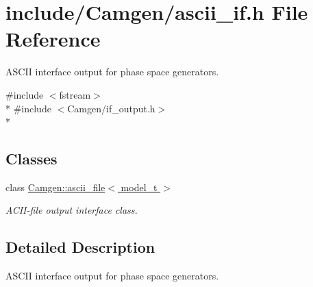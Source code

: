 \hypertarget{a00602}{}\section{include/\+Camgen/ascii\+\_\+if.h File Reference}
\label{a00602}


A\+S\+C\+I\+I interface output for phase space generators.  


{\ttfamily \#include $<$fstream$>$}\\*
{\ttfamily \#include $<$Camgen/if\+\_\+output.\+h$>$}\\*
\subsection*{Classes}
\begin{DoxyCompactItemize}
\item 
class \hyperlink{a00017}{Camgen\+::ascii\+\_\+file$<$ model\+\_\+t $>$}
\begin{DoxyCompactList}\small\item\em A\+C\+I\+I-\/file output interface class. \end{DoxyCompactList}\end{DoxyCompactItemize}


\subsection{Detailed Description}
A\+S\+C\+I\+I interface output for phase space generators. 

